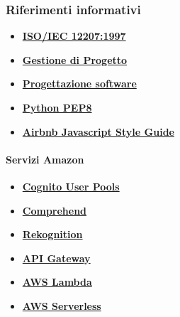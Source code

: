 \subsubsection{Riferimenti informativi}
\begin{itemize}
	\item 
	\href{https://www.math.unipd.it/~tullio/IS-1/2009/Approfondimenti/ISO_12207-1995.pdf}{\textbf{ISO/IEC 12207:1997}}
	\item
	\href {https://www.math.unipd.it/~tullio/IS-1/2021/Dispense/T06.pdf}{\textbf{Gestione di Progetto}}
	\item
	\href{https://www.math.unipd.it/~tullio/IS-1/2021/Dispense/T09.pdf}{\textbf{Progettazione software}}
	\item 
	\href{https://peps.python.org/pep-0008/}{\textbf{Python PEP8}}
	\item 
	\href{https://github.com/airbnb/javascript}{\textbf{Airbnb Javascript Style Guide}}
\end{itemize}
	\paragraph{\textbf{Servizi Amazon}} 
\begin{itemize}
	\item
	\href {https://docs.aws.amazon.com/cognito/latest/developerguide/cognito-user-identity-pools.html}{\textbf{Cognito User Pools}}
	\item
	\href{https://docs.aws.amazon.com/comprehend/latest/dg/what-is.html}{\textbf{Comprehend}}
	\item 
	\href{https://docs.aws.amazon.com/rekognition/latest/dg/what-is.html}{\textbf{Rekognition}}
	\item 
	\href{https://docs.aws.amazon.com/apigateway/latest/developerguide/welcome.html}{\textbf{API Gateway}}
	\item
	\href{https://docs.aws.amazon.com/lambda/latest/dg/welcome.html}{\textbf{AWS Lambda}}
	\item 
	\href{https://docs.aws.amazon.com/serverless-application-model/latest/developerguide/what-is-sam.html}{\textbf{AWS Serverless}}
\end{itemize}
